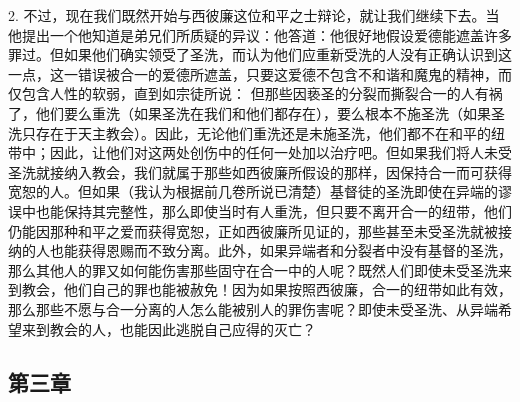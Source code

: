 2. 不过，现在我们既然开始与西彼廉这位和平之士辩论，就让我们继续下去。当他提出一个他知道是弟兄们所质疑的异议：他答道：他很好地假设爱德能遮盖许多罪过。但如果他们确实领受了圣洗，而认为他们应重新受洗的人没有正确认识到这一点，这一错误被合一的爱德所遮盖，只要这爱德不包含不和谐和魔鬼的精神，而仅包含人性的软弱，直到如宗徒所说： 但那些因亵圣的分裂而撕裂合一的人有祸了，他们要么重洗（如果圣洗在我们和他们都存在），要么根本不施圣洗（如果圣洗只存在于天主教会）。因此，无论他们重洗还是未施圣洗，他们都不在和平的纽带中；因此，让他们对这两处创伤中的任何一处加以治疗吧。但如果我们将人未受圣洗就接纳入教会，我们就属于那些如西彼廉所假设的那样，因保持合一而可获得宽恕的人。但如果（我认为根据前几卷所说已清楚）基督徒的圣洗即使在异端的谬误中也能保持其完整性，那么即使当时有人重洗，但只要不离开合一的纽带，他们仍能因那种和平之爱而获得宽恕，正如西彼廉所见证的，那些甚至未受圣洗就被接纳的人也能获得恩赐而不致分离。此外，如果异端者和分裂者中没有基督的圣洗，那么其他人的罪又如何能伤害那些固守在合一中的人呢？既然人们即使未受圣洗来到教会，他们自己的罪也能被赦免！因为如果按照西彼廉，合一的纽带如此有效，那么那些不愿与合一分离的人怎么能被别人的罪伤害呢？即使未受圣洗、从异端希望来到教会的人，也能因此逃脱自己应得的灭亡？\par


\subsection{第三章}

